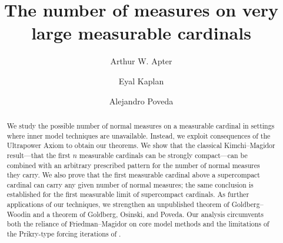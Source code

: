 \documentclass[11pt]{amsart}
\title[]{The number of  measures on very large measurable cardinals}
\author[Apter]{Arthur W. Apter}
\author[Kaplan]{Eyal Kaplan}
\author[Poveda]{Alejandro Poveda}
\theoremstyle{definition}
\theoremstyle{remark}
\newcommand\<{{<}}
\begin{document}
\maketitle


\begin{abstract}
    We study the possible number of normal measures on a measurable cardinal in settings where inner model techniques are unavailable. Instead, we exploit consequences of the Ultrapower Axiom to obtain our theorems. We show that the classical Kimchi–Magidor result—that the first $n$ measurable cardinals can be strongly compact—can be combined with an arbitrary prescribed pattern for the number of normal measures they carry. We also prove that the first measurable cardinal above a supercompact cardinal can carry any given number of normal measures; the same conclusion is established for the first measurable limit of supercompact cardinals. As further applications of our techniques, we strengthen an unpublished theorem of Goldberg–Woodin and a theorem of Goldberg, Osinski, and Poveda. Our analysis circumvents both the reliance of Friedman–Magidor \cite{FriedmanMagidor} on core model methods and the limitations of the Prikry-type forcing iterations of \cite{GitikKaplan}. 
\end{abstract}
\end{document}
